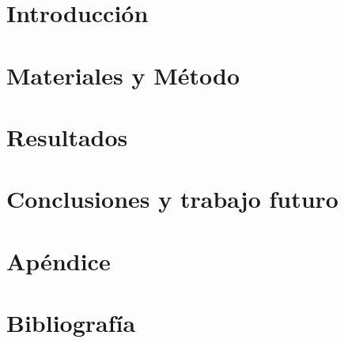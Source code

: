 \documentclass[11pt,a4paper]{tesis}
\begin{document}
\def\titulo{Licenciatura\xspace}

\def\autor{Damián Eliel Aleman}
\def\tituloTesis{Titulo de Tesis}
\def\runtitulo{\tituloTesis}
\def\director{Juan Manuel Pérez y Santiago Kalinowski}
\def\codirector{Agustín Gravano}
\def\lugar{Buenos Aires, 2017}
%



\frontmatter
\pagestyle{empty}




\tableofcontents

\mainmatter
\pagestyle{headings}


\chapter{Introducción}
\label{ch:introduccion}


\chapter{Materiales y Método}
\label{ch:metodo}


\chapter{Resultados}
\label{ch:resultados}


\chapter{Conclusiones y trabajo futuro}
\label{ch:conclusiones}


\chapter{Apéndice}
\label{ch:apendice}



\chapter{Bibliografía}
\backmatter



\end{document}
